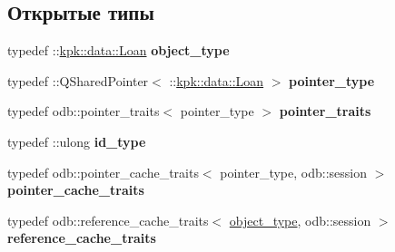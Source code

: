 \subsection*{Открытые типы}
\begin{DoxyCompactItemize}
\item 
typedef \+::\hyperlink{classkpk_1_1data_1_1_loan}{kpk\+::data\+::\+Loan} {\bfseries object\+\_\+type}\hypertarget{classodb_1_1access_1_1object__traits_3_01_1_1kpk_1_1data_1_1_loan_01_4_a20508ee3fab1b961a0ac102423ed230f}{}\label{classodb_1_1access_1_1object__traits_3_01_1_1kpk_1_1data_1_1_loan_01_4_a20508ee3fab1b961a0ac102423ed230f}

\item 
typedef \+::Q\+Shared\+Pointer$<$ \+::\hyperlink{classkpk_1_1data_1_1_loan}{kpk\+::data\+::\+Loan} $>$ {\bfseries pointer\+\_\+type}\hypertarget{classodb_1_1access_1_1object__traits_3_01_1_1kpk_1_1data_1_1_loan_01_4_a92f5b1d3d855822f220872c09f339ebc}{}\label{classodb_1_1access_1_1object__traits_3_01_1_1kpk_1_1data_1_1_loan_01_4_a92f5b1d3d855822f220872c09f339ebc}

\item 
typedef odb\+::pointer\+\_\+traits$<$ pointer\+\_\+type $>$ {\bfseries pointer\+\_\+traits}\hypertarget{classodb_1_1access_1_1object__traits_3_01_1_1kpk_1_1data_1_1_loan_01_4_abe16e62087fbd4ff5daf378bafff1714}{}\label{classodb_1_1access_1_1object__traits_3_01_1_1kpk_1_1data_1_1_loan_01_4_abe16e62087fbd4ff5daf378bafff1714}

\item 
typedef \+::ulong {\bfseries id\+\_\+type}\hypertarget{classodb_1_1access_1_1object__traits_3_01_1_1kpk_1_1data_1_1_loan_01_4_a2b3fc55db4366adef4b9a4627236dc4d}{}\label{classodb_1_1access_1_1object__traits_3_01_1_1kpk_1_1data_1_1_loan_01_4_a2b3fc55db4366adef4b9a4627236dc4d}

\item 
typedef odb\+::pointer\+\_\+cache\+\_\+traits$<$ pointer\+\_\+type, odb\+::session $>$ {\bfseries pointer\+\_\+cache\+\_\+traits}\hypertarget{classodb_1_1access_1_1object__traits_3_01_1_1kpk_1_1data_1_1_loan_01_4_ad7751461118ea8ef3a60a4f6b397778e}{}\label{classodb_1_1access_1_1object__traits_3_01_1_1kpk_1_1data_1_1_loan_01_4_ad7751461118ea8ef3a60a4f6b397778e}

\item 
typedef odb\+::reference\+\_\+cache\+\_\+traits$<$ \hyperlink{classkpk_1_1data_1_1_loan}{object\+\_\+type}, odb\+::session $>$ {\bfseries reference\+\_\+cache\+\_\+traits}\hypertarget{classodb_1_1access_1_1object__traits_3_01_1_1kpk_1_1data_1_1_loan_01_4_a345c44b107a7ca1b0b1c66cf72292eda}{}\label{classodb_1_1access_1_1object__traits_3_01_1_1kpk_1_1data_1_1_loan_01_4_a345c44b107a7ca1b0b1c66cf72292eda}

\end{DoxyCompactItemize}
